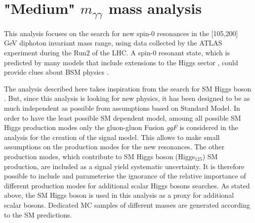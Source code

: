 \documentclass[a4paper, oneside, 11pt, openright]{book}
\begin{document}
 	\chapter{"Medium" $m_{\gamma\gamma}$ mass analysis}
 		This analysis focuses on the search for new spin-0 resonances in the [105,200] GeV diphoton invariant mass range, using data collected by the ATLAS experiment during the Run2 of the LHC. A spin-0 resonant state, which is predicted by many models that include extensions to the Higgs sector \cite{BSM}, could provide clues about BSM physics \cite{Branco_2012,dine_2016}. 	
 		
 		The analysis described here takes inspiration from the search for SM Higgs boson \cite{higgs_atlas}. But, since this analysis is looking for new physics, it has been designed to be as much independent as possible from assumptions based on Standard Model. In order to have the least possible SM dependent model, amoung all possible SM Higgs production modes only the gluon-gluon Fusion \textit{ggF} is considered in the analysis for the creation of the signal model. This allows to make small assumptions on the production modes for the new resonances. The other production modes, which contribute to SM Higgs boson (Higgs$_{125}$) SM production, are included as a signal yield systematic uncertainty. It is therefore possible to include and parameterise the ignorance of the relative importance of different production modes for additional scalar Higgs bosons searches. As stated above, the SM Higgs boson is used in this analysis as a proxy for additional scalar bosons. Dedicated MC samples of different masses are generated according to the SM predictions.
 		
\end{document}
